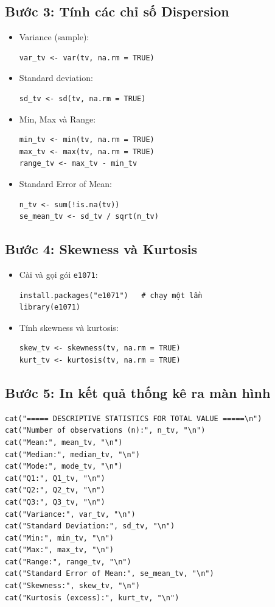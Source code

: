 \subsection*{Bước 3: Tính các chỉ số Dispersion}

\begin{itemize}
    \item Variance (sample):
\begin{verbatim}
var_tv <- var(tv, na.rm = TRUE)
\end{verbatim}
    \item Standard deviation:
\begin{verbatim}
sd_tv <- sd(tv, na.rm = TRUE)
\end{verbatim}
    \item Min, Max và Range:
\begin{verbatim}
min_tv <- min(tv, na.rm = TRUE)
max_tv <- max(tv, na.rm = TRUE)
range_tv <- max_tv - min_tv
\end{verbatim}
    \item Standard Error of Mean:
\begin{verbatim}
n_tv <- sum(!is.na(tv))
se_mean_tv <- sd_tv / sqrt(n_tv)
\end{verbatim}
\end{itemize}

\subsection*{Bước 4: Skewness và Kurtosis}

\begin{itemize}
    \item Cài và gọi gói \texttt{e1071}:
\begin{verbatim}
install.packages("e1071")   # chạy một lần
library(e1071)
\end{verbatim}
    \item Tính skewness và kurtosis:
\begin{verbatim}
skew_tv <- skewness(tv, na.rm = TRUE)
kurt_tv <- kurtosis(tv, na.rm = TRUE)
\end{verbatim}
\end{itemize}

\subsection*{Bước 5: In kết quả thống kê ra màn hình}

\begin{verbatim}
cat("===== DESCRIPTIVE STATISTICS FOR TOTAL VALUE =====\n")
cat("Number of observations (n):", n_tv, "\n")
cat("Mean:", mean_tv, "\n")
cat("Median:", median_tv, "\n")
cat("Mode:", mode_tv, "\n")
cat("Q1:", Q1_tv, "\n")
cat("Q2:", Q2_tv, "\n")
cat("Q3:", Q3_tv, "\n")
cat("Variance:", var_tv, "\n")
cat("Standard Deviation:", sd_tv, "\n")
cat("Min:", min_tv, "\n")
cat("Max:", max_tv, "\n")
cat("Range:", range_tv, "\n")
cat("Standard Error of Mean:", se_mean_tv, "\n")
cat("Skewness:", skew_tv, "\n")
cat("Kurtosis (excess):", kurt_tv, "\n")
\end{verbatim}

